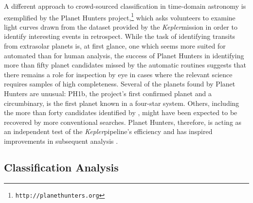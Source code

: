 \documentclass{ar2e}
\def\url#1{\texttt{#1}}
\def\Kepler{{\it Kepler}}
\begin{document}
A different approach to crowd-sourced classification in time-domain astronomy is
exemplified by the Planet Hunters
project,\footnote{\url{http://planethunters.org}} 
which asks volunteers to examine
light curves drawn from the dataset provided by the \Kepler mission in
order to identify interesting events in retrospect. While the task of
identifying transits from extrasolar planets is, at first glance, one which
seems more suited for automated than for human analysis, the success of Planet
Hunters in identifying more than fifty planet candidates missed by the automatic
routines suggests that there remains a role for inspection by eye in cases where
the relevant science requires samples of high completeness. Several of the
planets found by Planet Hunters are unusual: PH1b, the project's first confirmed
planet \citep{Schwamb++2013} and a circumbinary, is the first planet known in a
four-star system. 
Others, including the more than forty candidates identified 
by \citep{Wang++2013,Schmitt2014}, might have been
expected to be recovered by more conventional searches. Planet Hunters,
therefore, is acting as an independent test of the \Kepler pipeline's efficiency
\citep{Schwamb++2012} and has inspired improvements in subsequent analysis
\citep{Batalha++2013}. 



\subsection{Classification Analysis}
\label{sec:class:analysis}
\end{document}
